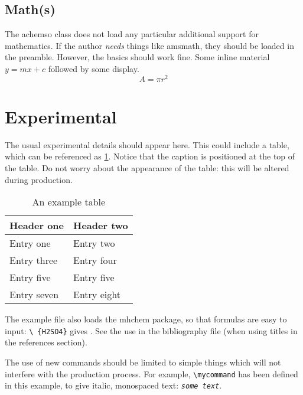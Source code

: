\documentclass[journal=jacsat,manuscript=article]{achemso}
\newcommand*{\mycommand}[1]{\texttt{\emph{#1}}}
\begin{document}
\subsection{Math(s)}

The \textsf{achemso} class does not load any particular additional
support for mathematics.  If the author \emph{needs} things like
\textsf{amsmath}, they should be loaded in the preamble.  However,
the basics should work fine.  Some inline material $ y = mx + c$
followed by some display. \[ A = \pi r^2 \]

\section{Experimental}

The usual experimental details should appear here.  This could
include a table, which can be referenced as \ref{tbl:example}. Notice
that the caption is positioned at the top of the table. Do not worry
about the appearance of the table: this will be altered during
production.
\begin{table}
  \caption{An example table}
  \label{tbl:example}
  \begin{tabular}{ll}
    \hline
    Header one & Header two \\
    \hline
    Entry one & Entry two \\
    Entry three & Entry four \\
    Entry five & Entry five \\
    Entry seven & Entry eight \\
    \hline
  \end{tabular}
\end{table}

The example file also loads the \textsf{mhchem} package, so
that formulas are easy to input: \texttt{\textbackslash
\ce\{H2SO4\}} gives .  See the use in the
bibliography file (when using titles in the references
section).

The use of new commands should be limited to simple things which will
not interfere with the production process.  For example,
\texttt{\textbackslash mycommand} has been defined in this example,
to give italic, monospaced text: \mycommand{some text}.

\acknowledgement
\end{document}
